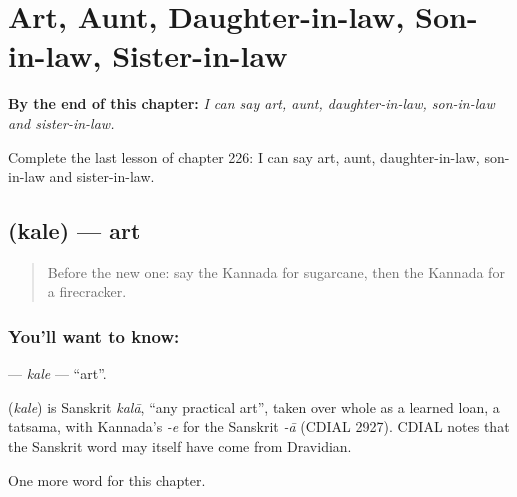 
\chapter{Art, Aunt, Daughter-in-law, Son-in-law, Sister-in-law}
\label{ch:ka-art-aunt-daughter-in-law-son-in-law-sister-in-law}

\begin{chapteropening}
\textbf{By the end of this chapter:} \emph{I can say art, aunt, daughter-in-law, son-in-law and sister-in-law.}

Complete the last lesson of chapter 226: I can say art, aunt, daughter-in-law, son-in-law and sister-in-law.
\end{chapteropening}

\section[\texorpdfstring{\kn{ಕಲೆ} (kale)}{ಕಲೆ (kale)}]{ (kale) — art}

\label{lesson:KA-C226-kale}



\begin{quote}
Before the new one: say the Kannada for sugarcane, then the Kannada for a firecracker.
\end{quote}

\subsection*{You'll want to know: }
\textbf{} — \emph{kale} — \textquotedblleft{}art\textquotedblright{}.

\begin{cousinweb}
\textbf{} (\emph{kale}) is Sanskrit \emph{kalā}, \textquotedblleft{}any practical art\textquotedblright{}, taken over whole as a learned loan, a tatsama, with Kannada's \emph{-e} for the Sanskrit \emph{-ā} (CDIAL 2927). CDIAL notes that the Sanskrit word may itself have come from Dravidian.
\end{cousinweb}

\begin{grammarlens}[title={What you've built}]
One more word for this chapter.
\end{grammarlens}

